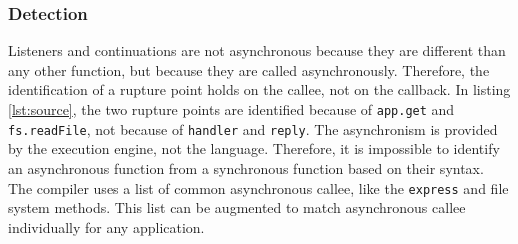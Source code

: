 

\subsubsection{Detection}

Listeners and continuations are not asynchronous because they are different than any other function, but because they are called asynchronously.
Therefore, the identification of a rupture point holds on the callee, not on the callback.
In listing \ref{lst:source}, the two rupture points are identified because of \texttt{app.get} and \texttt{fs.readFile}, not because of \texttt{handler} and \texttt{reply}.
The asynchronism is provided by the execution engine, not the language.
Therefore, it is impossible to identify an asynchronous function from a synchronous function based on their syntax.
The compiler uses a list of common asynchronous callee, like the \texttt{express} and file system methods.
This list can be augmented to match asynchronous callee individually for any application.



